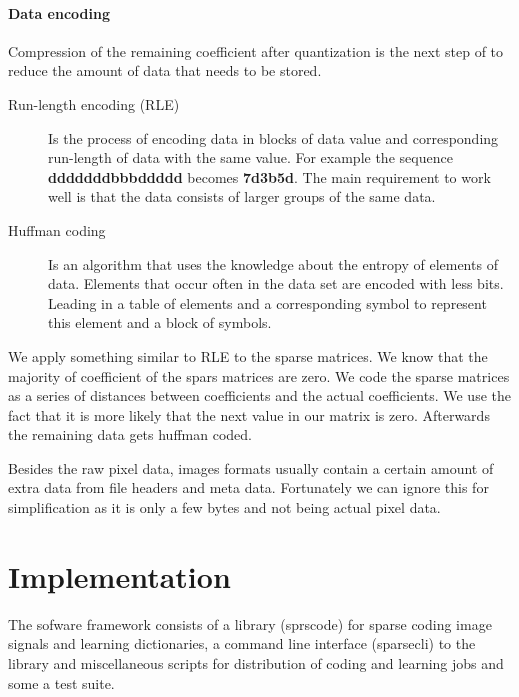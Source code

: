 \paragraph{Data encoding}
Compression of the remaining coefficient after quantization is the next step
of to reduce the amount of data that needs to be stored.

\begin{description}
 \item[Run-length encoding (RLE)] Is the process of encoding data in blocks of
data value and corresponding run-length of data with the same value. 
For example the sequence {\bf dddddddbbbddddd} becomes {\bf7d3b5d}.
The main requirement to work well is that the data consists of larger groups of
the same
data.
  \item[Huffman coding] Is an algorithm that uses the knowledge about the
entropy of elements of data. Elements that occur often in the data set are
encoded with less bits. Leading in a table of elements and a corresponding
symbol to represent this element and a block of symbols.
\end{description}

We apply something similar to RLE to the sparse matrices. We know that the
majority of coefficient of the spars matrices are zero. We code the sparse
matrices as a series of distances between coefficients and the actual
coefficients. We use the fact that it is more likely that the next value in our
matrix is zero. Afterwards the remaining data gets huffman coded.

Besides the raw pixel data, images formats usually contain a certain amount
of extra data from file headers and meta data. Fortunately we can ignore this
for simplification as it is only a few bytes and not being actual pixel data.



\section{Implementation}
The sofware framework consists of a library (sprscode) for sparse coding image
signals and learning dictionaries, a command line interface (sparsecli) to the
library and miscellaneous scripts for distribution of coding and learning jobs
and some a test suite.

